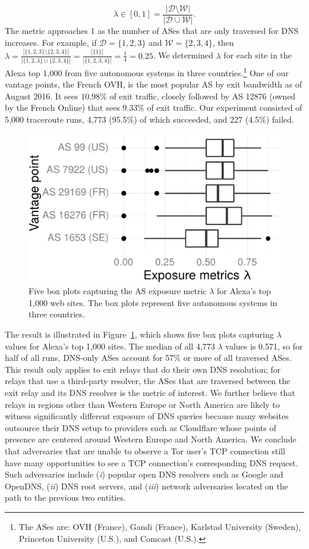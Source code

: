 \begin{equation}
\label{equ:exposure}
\lambda \in [0, 1] =
\frac{|\mathcal{D} \setminus \mathcal{W}|}
     {|\mathcal{D} \cup \mathcal{W}|}.
\end{equation}
\noindent
The metric approaches 1 as the number of ASes that are only traversed for DNS
increases.  For example, if $\mathcal{D} = \{1,2,3\}$ and $\mathcal{W} =
\{2,3,4\}$, then $\lambda =
\frac{|\{1,2,3\} \setminus \{2,3,4\}|}{|\{1,2,3\} \cup \{2,3,4\}|} =
\frac{|\{1\}|}{|\{1,2,3,4\}|} =
\frac{1}{4} =
0.25$.  We determined $\lambda$ for each site in the Alexa top 1,000 from five
autonomous systems in three countries.\footnote{The ASes are: OVH (France),
Gandi (France), Karlstad University (Sweden), Princeton University (U.S.), and
Comcast (U.S.).} One of our vantage points, the French OVH, is the most popular
AS by exit bandwidth as of August 2016.  It sees $10.98\%$ of exit traffic,
closely followed by AS 12876 (owned by the French Online) that sees $9.33\%$ of
exit traffic.  Our experiment consisted of 5,000 traceroute runs, 4,773 (95.5\%)
of which succeeded, and 227 (4.5\%) failed.

\begin{figure}[t]
	\centering
	\includegraphics[width=0.7\linewidth]{figures/dns-exposure.pdf}
	\caption{Five box plots capturing the AS exposure metric $\lambda$ for
		Alexa's top 1,000 web sites.  The box plots represent five autonomous
		systems in three countries.}
	\label{fig:exposure}
\end{figure}

The result is illustrated in Figure~\ref{fig:exposure}, which shows five box
plots capturing $\lambda$ values for Alexa's top 1,000 sites.  The median of
all 4,773 $\lambda$ values is 0.571, so for half of all runs, DNS-only ASes
account for 57\% or more of all traversed ASes.  This result only applies to
exit relays that do their own DNS resolution; for relays that use a third-party
resolver, the ASes that are traversed between the exit relay and its DNS
resolver is the metric of interest.  We further believe that relays in regions
other than Western Europe or North America are likely to witness significantly
different exposure of DNS queries because many websites outsource their DNS
setup to providers such as Cloudflare whose points of presence are centered
around Western Europe and North America.  We conclude that adversaries that are
unable to observe a Tor user's TCP connection still have many opportunities to
see a TCP connection's corresponding DNS request.  Such adversaries include
(\emph{i}) popular open DNS resolvers such as Google and OpenDNS, (\emph{ii})
DNS root servers, and (\emph{iii}) network adversaries located on the path to
the previous two entities.

